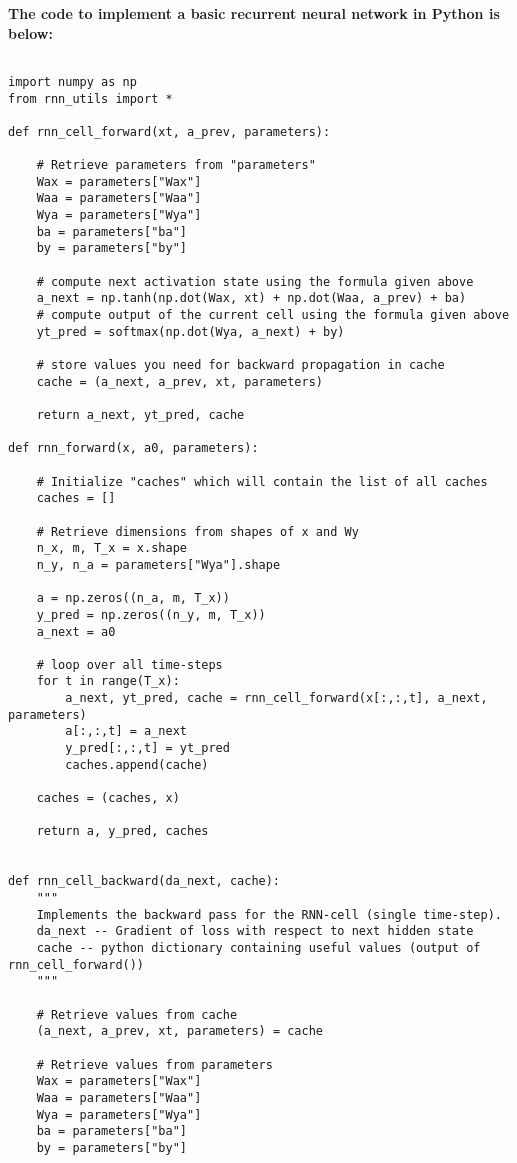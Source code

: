 \documentclass{article}
\begin{document}
\noindent 
\textbf{The code to implement a basic recurrent neural network in Python is below:}

\begin{lstlisting} 

import numpy as np
from rnn_utils import *

def rnn_cell_forward(xt, a_prev, parameters):

    # Retrieve parameters from "parameters"
    Wax = parameters["Wax"]
    Waa = parameters["Waa"]
    Wya = parameters["Wya"]
    ba = parameters["ba"]
    by = parameters["by"]

    # compute next activation state using the formula given above
    a_next = np.tanh(np.dot(Wax, xt) + np.dot(Waa, a_prev) + ba)
    # compute output of the current cell using the formula given above
    yt_pred = softmax(np.dot(Wya, a_next) + by)

    # store values you need for backward propagation in cache
    cache = (a_next, a_prev, xt, parameters)

    return a_next, yt_pred, cache

def rnn_forward(x, a0, parameters):

    # Initialize "caches" which will contain the list of all caches
    caches = []

    # Retrieve dimensions from shapes of x and Wy
    n_x, m, T_x = x.shape
    n_y, n_a = parameters["Wya"].shape
    
    a = np.zeros((n_a, m, T_x))
    y_pred = np.zeros((n_y, m, T_x))
    a_next = a0

    # loop over all time-steps
    for t in range(T_x):
        a_next, yt_pred, cache = rnn_cell_forward(x[:,:,t], a_next, parameters)
        a[:,:,t] = a_next
        y_pred[:,:,t] = yt_pred
        caches.append(cache)

    caches = (caches, x)

    return a, y_pred, caches
    

def rnn_cell_backward(da_next, cache):
    """
    Implements the backward pass for the RNN-cell (single time-step).
    da_next -- Gradient of loss with respect to next hidden state
    cache -- python dictionary containing useful values (output of rnn_cell_forward())
    """

    # Retrieve values from cache
    (a_next, a_prev, xt, parameters) = cache

    # Retrieve values from parameters
    Wax = parameters["Wax"]
    Waa = parameters["Waa"]
    Wya = parameters["Wya"]
    ba = parameters["ba"]
    by = parameters["by"]


\end{lstlisting}
\end{document}
